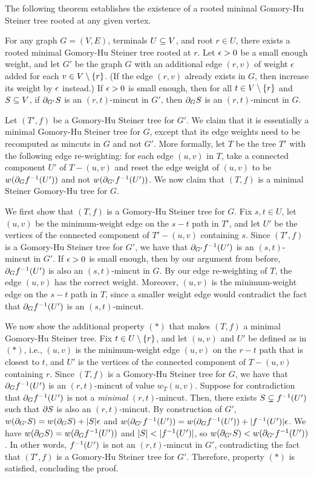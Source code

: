 The following theorem %
establishes the existence of a rooted minimal Gomory-Hu Steiner tree rooted at any given vertex.

\BT{}
For any graph $G=(V,E)$, terminals $U\subseteq V$, and root $r\in U$, there exists a rooted minimal Gomory-Hu Steiner tree rooted at $r$.
\ET
\BP
Let $\epsilon>0$ be a small enough weight, and let $G'$ be the graph $G$ with an additional edge $(r,v)$ of weight $\epsilon$ added for each $v\in V\setminus\{r\}$. (If the edge $(r,v)$ already exists in $G$, then increase its weight by $\epsilon$ instead.) If $\epsilon>0$ is small enough, then for all $t\in V\setminus\{r\}$ and $S\subseteq V$, if $\partial_{G'}S$ is an $(r,t)$-mincut in $G'$, then $\partial_GS$ is an $(r,t)$-mincut in $G$.

Let $(T',f)$ be a Gomory-Hu Steiner tree for $G'$. We claim that it is essentially a minimal Gomory-Hu Steiner tree for $G$, except that its edge weights need to be recomputed as mincuts in $G$ and not $G'$. More formally, let $T$ be the tree $T'$ with the following edge re-weighting: for each edge $(u,v)$ in $T$, take a connected component $U'$ of $T-(u,v)$ and reset the edge weight of $(u,v)$ to be $w(\partial_Gf^{-1}(U'))$ and not $w(\partial_{G'}f^{-1}(U'))$. We now claim that $(T,f)$ is a minimal Steiner Gomory-Hu tree for $G$.

We first show that $(T,f)$ is a Gomory-Hu Steiner tree for $G$. Fix $s,t\in U$, let $(u,v)$ be the minimum-weight edge on the $s-t$ path in $T'$, and let $U'$ be the vertices of the connected component of $T'-(u,v)$ containing $s$. Since $(T',f)$ is a Gomory-Hu Steiner tree for $G'$, we have that $\partial_{G'}f^{-1}(U')$ is an $(s,t)$-mincut in $G'$. If $\epsilon>0$ is small enough, then by our argument from before, $\partial_Gf^{-1}(U')$ is also an $(s,t)$-mincut in $G$. By our edge re-weighting of $T$, the edge $(u,v)$ has the correct weight. Moreover, $(u,v)$ is the minimum-weight edge on the $s-t$ path in $T$, since a smaller weight edge would contradict the fact that $\partial_Gf^{-1}(U')$ is an $(s,t)$-mincut.

We now show the additional property $(*)$ that makes $(T,f)$ a minimal Gomory-Hu Steiner tree. Fix $t\in U\setminus\{r\}$, and let $(u,v)$ and $U'$ be defined as in $(*)$, i.e., $(u,v)$ is the minimum-weight edge $(u,v)$ on the $r-t$ path that is closest to $t$, and $U'$ is the vertices of the connected component of $T-(u,v)$ containing $r$. Since $(T,f)$ is a Gomory-Hu Steiner tree for $G$, we have that $\partial_Gf^{-1}(U')$ is an $(r,t)$-mincut of value $w_T(u,v)$. Suppose for contradiction that $\partial_Gf^{-1}(U')$ is not a \emph{minimal} $(r,t)$-mincut. Then, there exists $S\subsetneq f^{-1}(U')$ such that $\partial S$ is also an $(r,t)$-mincut. By construction of $G'$, $w(\partial_{G'}S)=w(\partial_GS)+|S|\epsilon$ and $w(\partial_{G'}f^{-1}(U')) = w(\partial_Gf^{-1}(U'))+|f^{-1}(U')|\epsilon$. We have $w(\partial_GS)=w(\partial_Gf^{-1}(U'))$ and $|S|<|f\inv(U')|$, so $w(\partial_{G'}S)<w(\partial_{G'}f^{-1}(U'))$. In other words, $f^{-1}(U')$ is not an $(r,t)$-mincut in $G'$, contradicting the fact that $(T',f)$ is a Gomory-Hu Steiner tree for $G'$. Therefore, property $(*)$ is satisfied, concluding the proof.
\EP


